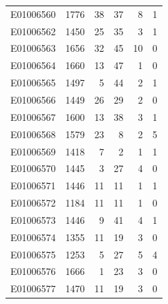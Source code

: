 \documentclass[
  letterpaper,
  DIV=11,
  numbers=noendperiod]{scrreprt}
\begin{document}
\begin{tabular}{lrrrrr}
E01006560     &    1776 &      38 &                    37 &                               8 &                       1 \\
E01006562     &    1450 &      25 &                    35 &                               3 &                       1 \\
E01006563     &    1656 &      32 &                    45 &                              10 &                       0 \\
E01006564     &    1660 &      13 &                    47 &                               1 &                       0 \\
E01006565     &    1497 &       5 &                    44 &                               2 &                       1 \\
E01006566     &    1449 &      26 &                    29 &                               2 &                       0 \\
E01006567     &    1600 &      13 &                    38 &                               3 &                       1 \\
E01006568     &    1579 &      23 &                     8 &                               2 &                       5 \\
E01006569     &    1418 &       7 &                     2 &                               1 &                       1 \\
E01006570     &    1445 &       3 &                    27 &                               4 &                       0 \\
E01006571     &    1446 &      11 &                    11 &                               1 &                       1 \\
E01006572     &    1184 &      11 &                    11 &                               1 &                       0 \\
E01006573     &    1446 &       9 &                    41 &                               4 &                       1 \\
E01006574     &    1355 &      11 &                    19 &                               3 &                       0 \\
E01006575     &    1253 &       5 &                    27 &                               5 &                       4 \\
E01006576     &    1666 &       1 &                    23 &                               3 &                       0 \\
E01006577     &    1470 &      11 &                    19 &                               3 &                       0 \\

\end{tabular}
\end{document}
